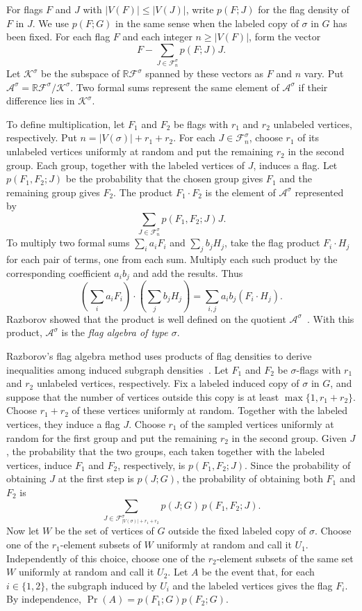 For flags $F$ and $J$ with $|V(F)|\leq |V(J)|$, write $p(F;J)$
for the flag density of $F$ in $J$. We use $p(F;G)$ in the same
sense when the labeled copy of $\sigma$ in $G$ has been fixed.
For each flag $F$ and each
integer $n\geq |V(F)|$, form the vector
\[
  F-\sum_{J\in\mathcal F^\sigma_n}p(F;J)J.
\]
Let $\mathcal K^\sigma$ be the subspace of
$\mathbb R\mathcal F^\sigma$ spanned by these vectors as $F$
and $n$ vary. Put
$\mathcal A^\sigma=\mathbb R\mathcal F^\sigma/\mathcal K^\sigma$.
Two formal sums represent the same element of $\mathcal A^\sigma$
if their difference lies in $\mathcal K^\sigma$.

To define multiplication, let $F_1$ and $F_2$ be flags with
$r_1$ and $r_2$ unlabeled vertices, respectively. Put
$n=|V(\sigma)|+r_1+r_2$. For each $J\in\mathcal F^\sigma_n$,
choose $r_1$ of its unlabeled vertices uniformly at random
and put the remaining $r_2$ in the second group. Each group,
together with the labeled vertices of $J$, induces a flag.
Let $p(F_1,F_2;J)$ be the probability that the chosen group
gives $F_1$ and the remaining group gives $F_2$. The product
$F_1\cdot F_2$ is the element of $\mathcal A^\sigma$ represented by
\[
  \sum_{J\in\mathcal F^\sigma_n}p(F_1,F_2;J)J.
\]
To multiply two formal sums $\sum_i a_iF_i$ and $\sum_j b_jH_j$,
take the flag product $F_i\cdot H_j$ for each pair of terms, one
from each sum. Multiply each such product by the corresponding
coefficient $a_ib_j$ and add the results. Thus
\[
  \left(\sum_i a_iF_i\right)\cdot\left(\sum_j b_jH_j\right)
  =\sum_{i,j}a_ib_j(F_i\cdot H_j).
\]
Razborov showed that the product is well defined on the quotient
$\mathcal A^\sigma$~\cite{Razborov2007}. With this product,
$\mathcal A^\sigma$ is the \emph{flag algebra of type $\sigma$}.

Razborov's flag algebra method uses products of flag densities
to derive inequalities among induced subgraph
densities~\cite{Razborov2007,CarliSilvaOliveiraSato2016}.
Let $F_1$ and $F_2$ be $\sigma$-flags with $r_1$ and $r_2$
unlabeled vertices, respectively. Fix a labeled induced copy
of $\sigma$ in $G$, and suppose that the number of vertices
outside this copy is at least $\max\{1,r_1+r_2\}$. Choose
$r_1+r_2$ of these vertices uniformly at random. Together with
the labeled vertices, they induce a flag $J$. Choose $r_1$ of
the sampled vertices uniformly at random for the first group
and put the remaining $r_2$ in the second group. Given $J$,
the probability that the two groups, each taken together with
the labeled vertices, induce $F_1$ and $F_2$, respectively, is
$p(F_1,F_2;J)$. Since the probability of obtaining $J$ at the
first step is $p(J;G)$, the probability of obtaining both
$F_1$ and $F_2$ is
\[
  \sum_{J\in\mathcal F^\sigma_{|V(\sigma)|+r_1+r_2}}
  p(J;G)\,p(F_1,F_2;J).
\]
Now let $W$ be the set of vertices of $G$ outside the fixed labeled
copy of $\sigma$. Choose one of the $r_1$-element subsets of $W$
uniformly at random and call it $U_1$. Independently of this
choice, choose one of the $r_2$-element subsets of the same set
$W$ uniformly at random and call it $U_2$. Let $A$ be the event
that, for each $i\in\{1,2\}$, the subgraph induced by $U_i$ and
the labeled vertices gives the flag $F_i$. By independence,
$\Pr(A)=p(F_1;G)p(F_2;G)$.

